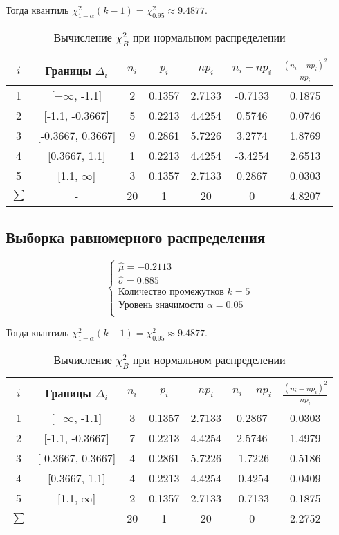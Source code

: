 \documentclass[12pt,a4paper]{article}
\begin{document}
Тогда квантиль $\chi^2_{1-\alpha}(k-1)=\chi^2_{0.95}\approx9.4877$. 
\begin{table}[H]
    \centering
    \begin{tabular}{|c|c|c|c|c|c|c|}
    \hline
    $i$ & Границы $\Delta_i$ & $n_i$ & $p_i$ & $np_i$ & $n_i-np_i$ & $\frac{(n_i-np_i)^2}{np_i}$\\\hline\hline
    1 & [$-\infty$, -1.1] & 2 & 0.1357 & 2.7133 & -0.7133 & 0.1875\\\hline
    2 & [-1.1, -0.3667] & 5 & 0.2213 & 4.4254 & 0.5746 & 0.0746\\\hline
    3 & [-0.3667, 0.3667] & 9 & 0.2861 & 5.7226 & 3.2774 & 1.8769\\\hline
    4 & [0.3667, 1.1] & 1 & 0.2213 & 4.4254 & -3.4254 & 2.6513\\\hline
    5 & [1.1, $\infty$] & 3 & 0.1357 & 2.7133 & 0.2867 & 0.0303\\\hline
    $\sum$ & - & 20 & 1 & 20 & 0 & 4.8207\\\hline
    \end{tabular}
    \caption{Вычисление $\chi^2_B$ при нормальном распределении}
\end{table}

\subsection{Выборка равномерного распределения}
\begin{equation}
    \left\{
    \begin{array}{ll}
        \hat{\mu}=-0.2113\\
        \hat{\sigma}=0.885\\
        \text{Количество промежутков }k=5\\
        \text{Уровень значимости }\alpha=0.05\\
    \end{array}
    \right.
\end{equation}

Тогда квантиль $\chi^2_{1-\alpha}(k-1)=\chi^2_{0.95}\approx9.4877$. 
\begin{table}[H]
    \centering
    \begin{tabular}{|c|c|c|c|c|c|c|}
    \hline
    $i$ & Границы $\Delta_i$ & $n_i$ & $p_i$ & $np_i$ & $n_i-np_i$ & $\frac{(n_i-np_i)^2}{np_i}$\\\hline\hline
    1 & [$-\infty$, -1.1] & 3 & 0.1357 & 2.7133 & 0.2867 & 0.0303\\\hline
    2 & [-1.1, -0.3667] & 7 & 0.2213 & 4.4254 & 2.5746 & 1.4979\\\hline
    3 & [-0.3667, 0.3667] & 4 & 0.2861 & 5.7226 & -1.7226 & 0.5186\\\hline
    4 & [0.3667, 1.1] & 4 & 0.2213 & 4.4254 & -0.4254 & 0.0409\\\hline
    5 & [1.1, $\infty$] & 2 & 0.1357 & 2.7133 & -0.7133 & 0.1875\\\hline
    $\sum$ & - & 20 & 1 & 20 & 0 & 2.2752\\\hline
    \end{tabular}
    \caption{Вычисление $\chi^2_B$ при нормальном распределении}
\end{table}
\end{document}
